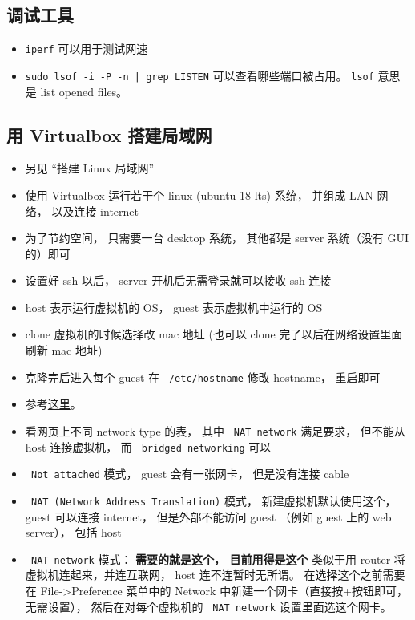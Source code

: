 \subsection{调试工具}
\begin{itemize}
\item \verb|iperf| 可以用于测试网速
\item \verb`sudo lsof -i -P -n | grep LISTEN` 可以查看哪些端口被占用。 \verb|lsof| 意思是 list opened files。
\end{itemize}


\subsection{用 Virtualbox 搭建局域网}\label{sub_LinWeb_1}
\begin{itemize}
\item 另见 “搭建 Linux 局域网”
\item 使用 Virtualbox 运行若干个 linux (ubuntu 18 lts) 系统， 并组成 LAN 网络， 以及连接 internet
\item 为了节约空间， 只需要一台 desktop 系统， 其他都是 server 系统（没有 GUI 的）即可
\item 设置好 ssh 以后， server 开机后无需登录就可以接收 ssh 连接
\item host 表示运行虚拟机的 OS， guest 表示虚拟机中运行的 OS
\item clone 虚拟机的时候选择改 mac 地址 (也可以 clone 完了以后在网络设置里面刷新 mac 地址)
\item 克隆完后进入每个 guest 在 \verb` /etc/hostname` 修改 hostname， 重启即可
\item 参考\href{https://www.thomas-krenn.com/en/wiki/Network_Configuration_in_VirtualBox}{这里}。
\item 看网页上不同 network type 的表， 其中 \verb` NAT network` 满足要求， 但不能从 host 连接虚拟机， 而 \verb` bridged networking` 可以
\item \verb` Not attached` 模式， guest 会有一张网卡， 但是没有连接 cable
\item \verb` NAT (Network Address Translation)` 模式， 新建虚拟机默认使用这个， guest 可以连接 internet， 但是外部不能访问 guest （例如 guest 上的 web server）， 包括 host
\item \verb` NAT network` 模式： \textbf{需要的就是这个， 目前用得是这个} 类似于用 router 将虚拟机连起来，并连互联网， host 连不连暂时无所谓。 在选择这个之前需要在 File->Preference 菜单中的 Network 中新建一个网卡（直接按+按钮即可，无需设置）， 然后在对每个虚拟机的 \verb` NAT network` 设置里面选这个网卡。

\end{itemize}
